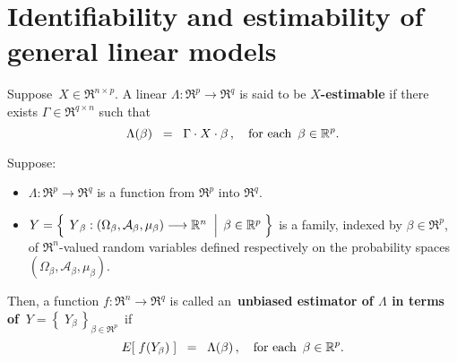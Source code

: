 

\section{Identifiability and estimability of general linear models}
\setcounter{theorem}{0}
\setcounter{equation}{0}

\renewcommand{\theenumi}{\roman{enumi}}
\renewcommand{\labelenumi}{\textnormal{(\theenumi)}$\;\;$}


\begin{definition}
\mbox{}\vskip 0.1cm\noindent
Suppose \,$X \in \Re^{n \times p}$.
A linear $\Lambda : \Re^{p} \longrightarrow \Re^{q}$ is said to be \textbf{$X$-estimable}
if there exists $\Gamma \in \Re^{q \times n}$ such that
\begin{equation*}
\Lambda(\beta) \;\; =\;\; \Gamma \cdot X \cdot \beta\,,
\quad
\textnormal{for each \,$\beta \in \Re^{p}$}.
\end{equation*}
\end{definition}

\begin{definition}
\mbox{}\vskip 0.1cm\noindent
Suppose:
\begin{itemize}
\item
	$\Lambda : \Re^{p} \longrightarrow \Re^{q}$ is a function from $\Re^{p}$ into $\Re^{q}$.
\item
	$Y = \left\{\;
		\left.
		\overset{{\color{white}.}}{Y}_{\beta} : (\Omega_{\beta},\mathcal{A}_{\beta},\mu_{\beta}) \longrightarrow \Re^{n}
		\;\;\right\vert\;
		\beta \in \Re^{p}
		\;\right\}$
	is a family, indexed by $\beta \in \Re^{p}$,
	of $\Re^{n}$-valued random variables defined respectively on the
	probability spaces $(\Omega_{\beta},\mathcal{A}_{\beta},\mu_{\beta})$.
\end{itemize}
Then,
a function $f : \Re^{n} \longrightarrow \Re^{q}$ is called an
\,{\color{red}\textbf{unbiased estimator of $\Lambda$ in terms of \,$Y = \left\{\;Y_{\beta}\,\right\}_{\beta\in\Re^{p}}$}}\,
if
\begin{equation*}
E\!\left[\;f(Y_{\beta})\;\right] \;\; =\;\; \Lambda(\beta)\,,
\quad
\textnormal{for each \,$\beta \in \Re^{p}$}.
\end{equation*}
\end{definition}

